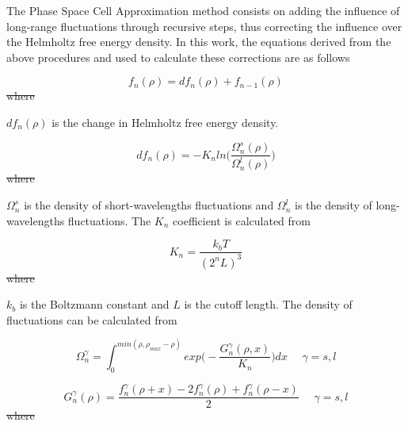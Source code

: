 \documentclass[preprint,12pt,3p]{elsarticle}
\providecommand{\DIFadd}[1]{{\protect\color{blue}\uwave{#1}}} %
\providecommand{\DIFdel}[1]{{\protect\color{red}\sout{#1}}}                      %
\providecommand{\DIFaddbegin}{} %
\providecommand{\DIFaddend}{} %
\providecommand{\DIFdelbegin}{} %
\providecommand{\DIFdelend}{} %
\begin{document}
	The Phase Space Cell Approximation method consists on adding the influence of long-range fluctuations through recursive steps, thus correcting the influence over the Helmholtz free energy density. In this work, the equations derived from the above procedures and used to calculate these corrections are as follows
	\DIFaddbegin 

\DIFaddend \begin{equation} \label{eq:fn}
    f_{n}(\rho) = df_{n}(\rho) + f_{n-1}(\rho)
\end{equation}
\DIFdelbegin \DIFdel{where }\DIFdelend \DIFaddbegin 

    \DIFadd{Where }\DIFaddend $df_{n}(\rho)$ is the change in Helmholtz free energy density.

\begin{equation} \label{eq:dfn}
    df_{n}(\rho) = -K_{n} ln\DIFdelbegin %
\DIFdelend \DIFaddbegin \Bigg(\DIFaddend \frac{\Omega_{n}^{s}(\rho)}{\Omega_{n}^{l}(\rho)}\DIFdelbegin %
\DIFdelend \DIFaddbegin \Bigg)
\DIFaddend \end{equation}
\DIFdelbegin \DIFdel{where }\DIFdelend \DIFaddbegin 

    \DIFadd{Where }\DIFaddend $\Omega_{n}^{s}$ is the density of short-wavelengths fluctuations and $\Omega_{n}^{l}$ is the density of long-wavelengths fluctuations. The $K_{n}$ coefficient is calculated from
\DIFaddbegin 

\DIFaddend \begin{equation} \label{eq:Kn}
    K_{n} = \frac{k_{b}T}{(2^{n}L)^3}
\end{equation}
\DIFdelbegin \DIFdel{where }\DIFdelend \DIFaddbegin 

    \DIFadd{Where }\DIFaddend $k_{b}$ is the Boltzmann constant and $L$ is the cutoff length. The density of fluctuations can be calculated from
    \DIFaddbegin 

\DIFaddend \begin{equation} \label{eq:Omega}
    \Omega_{n}^{\gamma} = \int_{0}^{min(\rho,\rho_{max}-\rho)}exp\DIFdelbegin %
\DIFdelend \DIFaddbegin \Bigg(\DIFaddend -\frac{G_{n}^{\gamma}(\rho,x)}{K_{n}}\DIFdelbegin %
\DIFdelend \DIFaddbegin \Bigg)\DIFaddend dx \ \ \ \ \ \   \gamma = s,l
\end{equation}

\begin{equation} \label{eq:Gn}
    G_{n}^{\gamma}(\rho) = \frac{f_{n}^{\gamma}(\rho+x)-2f_{n}^{\gamma}(\rho)+f_{n}^{\gamma}(\rho-x)}{2} \ \ \ \ \ \   \gamma = s,l
\end{equation}
\DIFdelbegin \DIFdel{where }\DIFdelend \DIFaddbegin 
\end{document}
